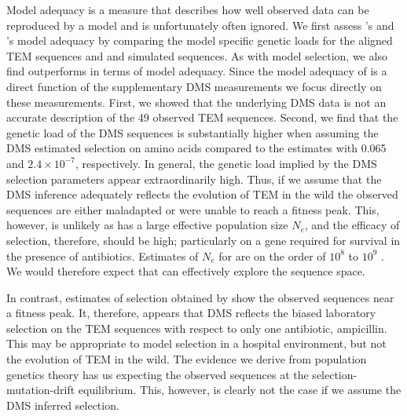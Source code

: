 \documentclass[fleqn,letterpaper]{article}
\begin{document}
Model adequacy is a measure that describes how well observed data can be reproduced by a model and is unfortunately often ignored.
We first assess \phydms's and \selac's model adequacy by comparing the model specific genetic loads for the aligned TEM sequences and and simulated sequences.
As with model selection, we also find \selac outperforms \phydms in terms of model adequacy.
Since the model adequacy of \phydms is a direct function of the supplementary DMS measurements we focus directly on these measurements.
First, we showed that the underlying DMS data is not an accurate description of the 49 observed TEM sequences.
Second, we find that the genetic load of the DMS sequences is substantially higher when assuming the DMS estimated selection on amino acids compared to the \selac estimates with 0.065 and  $2.4\times 10^{-7}$, respectively.
In general, the genetic load implied by the DMS selection parameters appear extraordinarily high.
Thus, if we assume that the DMS inference adequately reflects the evolution of TEM in the wild the observed sequences are either maladapted or were unable to reach a fitness peak.
This, however, is unlikely as \ecoli has a large effective population size $N_e$, and the efficacy of selection, therefore, should be high; particularly on a gene required for survival in the presence of antibiotics.
Estimates of $N_e$ for \ecoli are on the order of $10^8$ to $10^9$ \citep{OchmanAndWilson1987,hartl1994}.
We would therefore expect that \ecoli can effectively explore the sequence space.

In contrast, estimates of selection obtained by \selac show the observed sequences near a fitness peak.
It, therefore, appears that DMS reflects the biased laboratory selection on the TEM sequences with respect to only one antibiotic, ampicillin. 
This may be appropriate to model selection in a hospital environment, but not the evolution of TEM in the wild.
The evidence we derive from population genetics theory has us expecting the observed sequences at the selection-mutation-drift equilibrium.
This, however, is clearly not the case if we assume the DMS inferred selection.
\end{document}
